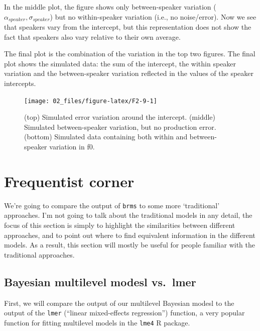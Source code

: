 \documentclass[
]{book}
\begin{document}
In the middle plot, the figure shows only between-speaker variation (\(\alpha_{speaker}, \sigma_{speaker}\)) but no within-speaker variation (i.e., no noise/error). Now we see that speakers vary from the intercept, but this representation does not show the fact that speakers also vary relative to their own average.

The final plot is the combination of the variation in the top two figures. The final plot shows the simulated data: the sum of the intercept, the within speaker variation and the between-speaker variation reflected in the values of the speaker intercepts.

\begin{figure}

{\centering \texttt{[image: 02\_files/figure-latex/F2-9-1]} 

}

\caption{(top) Simulated error variation around the intercept. (middle) Simulated between-speaker variation, but no production error. (bottom) Simulated data containing both within and between-speaker variation in f0.}\label{fig:F2-9}
\end{figure}

\hypertarget{frequentist-corner}{%
\section{Frequentist corner}\label{frequentist-corner}}

We're going to compare the output of \texttt{brms} to some more `traditional' approaches. I'm not going to talk about the traditional models in any detail, the focus of this section is simply to highlight the similarities between different approaches, and to point out where to find equivalent information in the different models. As a result, this section will mostly be useful for people familiar with the traditional approaches.

\hypertarget{bayesian-multilevel-modesl-vs.-lmer}{%
\subsection{Bayesian multilevel modesl vs.~lmer}\label{bayesian-multilevel-modesl-vs.-lmer}}

First, we will compare the output of our multilevel Bayesian modesl to the output of the \texttt{lmer} (``linear mixed-effects regression'') function, a very popular function for fitting multilevel models in the \texttt{lme4} R package.
\end{document}
